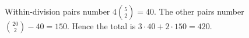Within-division pairs number $4\binom52=40$. The other pairs number $\binom{20}2-40=150$. Hence the total is $3\cdot40+2\cdot150=\boxed{420}$.
